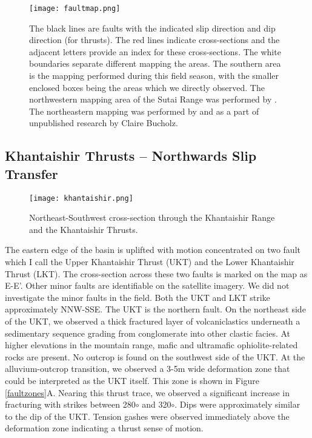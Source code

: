 \documentclass[10pt,a4paper]{article}
\begin{document}
\begin{figure}[h!]
  \centering
  \texttt{[image: faultmap.png]}
  \caption{The black lines are faults with the indicated slip direction and dip direction (for thrusts). The red lines indicate cross-sections and the adjacent letters provide an index for these cross-sections. The white boundaries separate different mapping the areas. The southern area is the mapping performed during this field season, with the smaller enclosed boxes being the areas which we directly observed. The northwestern mapping area of the Sutai Range was performed by \citet{Cunningham2003}. The northeastern mapping was performed by \citet{Dijkstra2006} and as a part of unpublished research by Claire Bucholz.}
  \label{faultmap}
\end{figure}

\subsection{Khantaishir Thrusts -- Northwards Slip Transfer}
\begin{figure}[h!]
  \centering
  \texttt{[image: khantaishir.png]}
  \caption{Northeast-Southwest cross-section through the Khantaishir Range and the Khantaishir Thrusts.}
\end{figure}

The eastern edge of the basin is uplifted with motion concentrated on two fault which I call the Upper Khantaishir Thrust (UKT) and the Lower Khantaishir Thrust (LKT). The cross-section across these two faults is marked on the map as E-E'. Other minor faults are identifiable on the satellite imagery. We did not investigate the minor faults in the field. Both the UKT and LKT strike approximately NNW-SSE. The UKT is the northern fault. On the northeast side of the UKT, we observed a thick fractured layer of volcaniclastics underneath a sedimentary sequence grading from conglomerate into other clastic facies. At higher elevations in the mountain range, mafic and ultramafic ophiolite-related rocks are present. No outcrop is found on the southwest side of the UKT. At the alluvium-outcrop transition, we observed a 3-5m wide deformation zone that could be interpreted as the UKT itself. This zone is shown in Figure \ref{faultzones}A. Nearing this thrust trace, we observed a significant increase in fracturing with strikes between 280$\circ$ and 320$\circ$. Dips were approximately similar to the dip of the UKT. Tension gashes were observed immediately above the deformation zone indicating a thrust sense of motion.
\end{document}
